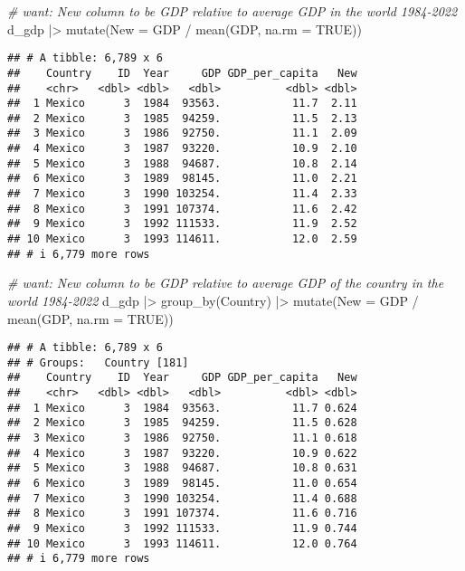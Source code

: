 \documentclass[
]{article}
\newenvironment{Shaded}{\begin{snugshade}}{\end{snugshade}}
\newcommand{\AttributeTok}[1]{\textcolor[rgb]{0.77,0.63,0.00}{#1}}
\newcommand{\CommentTok}[1]{\textcolor[rgb]{0.56,0.35,0.01}{\textit{#1}}}
\newcommand{\ConstantTok}[1]{\textcolor[rgb]{0.00,0.00,0.00}{#1}}
\newcommand{\FunctionTok}[1]{\textcolor[rgb]{0.00,0.00,0.00}{#1}}
\newcommand{\NormalTok}[1]{#1}
\newcommand{\SpecialCharTok}[1]{\textcolor[rgb]{0.00,0.00,0.00}{#1}}
\begin{document}
\begin{Shaded}
\begin{Highlighting}[]
\CommentTok{\# want: New column to be GDP relative to average GDP in the world 1984{-}2022}
\NormalTok{d\_gdp }\SpecialCharTok{|\textgreater{}} \FunctionTok{mutate}\NormalTok{(}\AttributeTok{New =}\NormalTok{ GDP }\SpecialCharTok{/} \FunctionTok{mean}\NormalTok{(GDP, }\AttributeTok{na.rm =} \ConstantTok{TRUE}\NormalTok{))}
\end{Highlighting}
\end{Shaded}

\begin{verbatim}
## # A tibble: 6,789 x 6
##    Country    ID  Year     GDP GDP_per_capita   New
##    <chr>   <dbl> <dbl>   <dbl>          <dbl> <dbl>
##  1 Mexico      3  1984  93563.           11.7  2.11
##  2 Mexico      3  1985  94259.           11.5  2.13
##  3 Mexico      3  1986  92750.           11.1  2.09
##  4 Mexico      3  1987  93220.           10.9  2.10
##  5 Mexico      3  1988  94687.           10.8  2.14
##  6 Mexico      3  1989  98145.           11.0  2.21
##  7 Mexico      3  1990 103254.           11.4  2.33
##  8 Mexico      3  1991 107374.           11.6  2.42
##  9 Mexico      3  1992 111533.           11.9  2.52
## 10 Mexico      3  1993 114611.           12.0  2.59
## # i 6,779 more rows
\end{verbatim}

\begin{Shaded}
\begin{Highlighting}[]
\CommentTok{\# want: New column to be GDP relative to average GDP of the country in the world 1984{-}2022}
\NormalTok{d\_gdp }\SpecialCharTok{|\textgreater{}} 
  \FunctionTok{group\_by}\NormalTok{(Country) }\SpecialCharTok{|\textgreater{}}
  \FunctionTok{mutate}\NormalTok{(}\AttributeTok{New =}\NormalTok{ GDP }\SpecialCharTok{/} \FunctionTok{mean}\NormalTok{(GDP, }\AttributeTok{na.rm =} \ConstantTok{TRUE}\NormalTok{))}
\end{Highlighting}
\end{Shaded}

\begin{verbatim}
## # A tibble: 6,789 x 6
## # Groups:   Country [181]
##    Country    ID  Year     GDP GDP_per_capita   New
##    <chr>   <dbl> <dbl>   <dbl>          <dbl> <dbl>
##  1 Mexico      3  1984  93563.           11.7 0.624
##  2 Mexico      3  1985  94259.           11.5 0.628
##  3 Mexico      3  1986  92750.           11.1 0.618
##  4 Mexico      3  1987  93220.           10.9 0.622
##  5 Mexico      3  1988  94687.           10.8 0.631
##  6 Mexico      3  1989  98145.           11.0 0.654
##  7 Mexico      3  1990 103254.           11.4 0.688
##  8 Mexico      3  1991 107374.           11.6 0.716
##  9 Mexico      3  1992 111533.           11.9 0.744
## 10 Mexico      3  1993 114611.           12.0 0.764
## # i 6,779 more rows
\end{verbatim}
\end{document}
